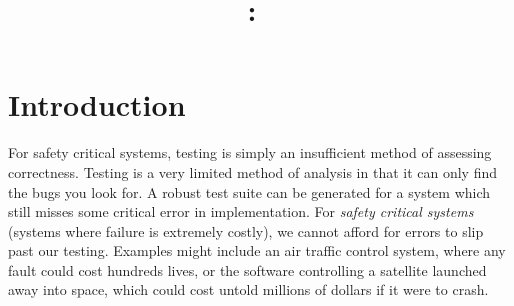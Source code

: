 \documentclass{article}
\title{
    \vspace{2in}
    \textmd{\textbf{\hmwkClass:\ \hmwkTitle}}\\
    \vspace{0.1in}\large{\textbf{\hmwkClassInstructor \hmwkClassTime}}
    \vspace{3in}
}
\author{\hmwkAuthorName}
\date{}
\begin{document}
\maketitle
\pagebreak
\section{Introduction}

For safety critical systems, testing is simply an insufficient method of assessing correctness. Testing is a very limited method of analysis in that it can only find the bugs you look for. A robust test suite can be generated for a system which still misses some critical error in implementation. For \textit{safety critical systems} (systems where failure is extremely costly), we cannot afford  for errors to slip past our testing. Examples might include an air traffic control system, where any fault could cost hundreds lives, or the software controlling a satellite launched away into space, which could cost untold millions of dollars if it were to crash.  \\
\end{document}
